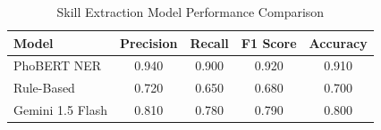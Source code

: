 \begin{table}[h]
\centering
\caption{Skill Extraction Model Performance Comparison}
\label{tab:model_comparison}
\begin{tabular}{lcccc}
\hline
\textbf{Model} & \textbf{Precision} & \textbf{Recall} & \textbf{F1 Score} & \textbf{Accuracy} \\
\hline
PhoBERT NER & 0.940 & 0.900 & 0.920 & 0.910 \\
Rule-Based & 0.720 & 0.650 & 0.680 & 0.700 \\
Gemini 1.5 Flash & 0.810 & 0.780 & 0.790 & 0.800 \\
\hline
\end{tabular}
\end{table}
